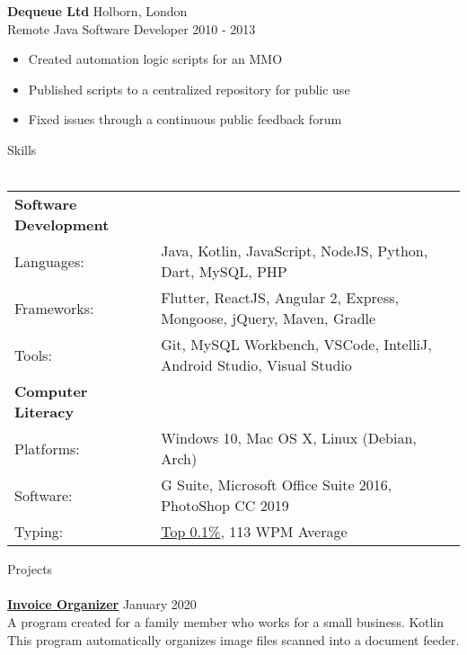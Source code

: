 \documentclass[a4paper]{article}
\newcommand{\lineunder} {
    \vspace*{-8pt} \\
    \hspace*{-18pt} \hrulefill \\
}
\newcommand{\header} [1] {
    {\hspace*{-18pt}\vspace*{6pt} {#1}}
    \vspace*{-6pt} \lineunder
}
\newcommand{\subheader} [1] {
    \hspace{2pt}
    \textbf{
        {\hspace*{-18pt}\vspace*{6pt} {#1}}
        \vspace*{-6pt}
    }
    \\
}
\begin{document}
\vspace{-2mm}

\textbf{Dequeue Ltd} \hfill Holborn, London\\
Remote Java Software Developer \hfill 2010 - 2013\\
\vspace{-3mm}
\begin{itemize} \itemsep 1pt
    \item Created automation logic scripts for an MMO
    \vspace{-1mm}
	\item Published scripts to a centralized repository for public use
	\vspace{-1mm}
	\item Fixed issues through a continuous public feedback forum
\end{itemize}

\header{Skills}
\vspace{2mm}
\begin{tabular}{ l l }
    \subheader{Software Development}
    \hspace{-3mm}
	Languages:      & Java, Kotlin, JavaScript, NodeJS, Python, Dart, MySQL, PHP    \\
    \hspace{-3mm}
	Frameworks:     & Flutter, ReactJS, Angular 2, Express, Mongoose, jQuery, Maven, Gradle \\
    \hspace{-3mm}
	Tools:          & Git, MySQL Workbench, VSCode, IntelliJ, Android Studio, Visual Studio
	\vspace{1mm}\\
    \subheader{Computer Literacy}
    \hspace{-3mm}
	Platforms:  & Windows 10, Mac OS X, Linux (Debian, Arch) \\
    \hspace{-3mm}
	Software:   & G Suite, Microsoft Office Suite 2016, PhotoShop CC 2019  \\
    \hspace{-3mm}
	Typing:     & \href{https://data.typeracer.com/misc/badge?user=tsedlar}{\ul{Top 0.1\%}}, 113 WPM Average \\
\end{tabular}
\vspace*{2mm}

\header{Projects}
{\textbf{\href{https://github.com/TSedlar/InvoiceOrganizer}{\ul{Invoice Organizer}}}} \hfill January 2020 \\
\vspace{1mm}
A program created for a family member who works for a small business. \hfill Kotlin \\ 
This program automatically organizes image files scanned into a document feeder. \\
\vspace*{1mm}
\end{document}
